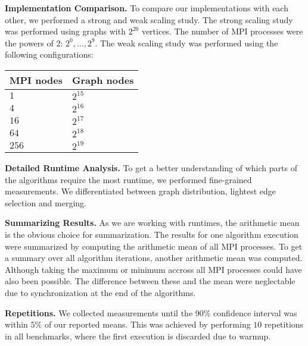\documentclass[letterpaper]{article}
\newcommand{\mypar}[1]{{\bf #1.}}
\begin{document}
\mypar{Implementation Comparison}
To compare our implementations with each other, we performed a strong and weak scaling study. The strong scaling study
was performed using graphs with $2^{20}$ vertices. The number of MPI processes were the powers of $2$: $2^0, \dotsc,
2^9$. The weak scaling study was performed using the following configurations:
\begin{table}[h!]
  \centering
  \begin{tabular}{ll} \toprule
    \textbf{MPI nodes} & \textbf{Graph nodes} \\\midrule
    $1$ & $2^{15}$ \\ 
    $4$ & $2^{16}$ \\ 
    $16$ & $2^{17}$ \\
    $64$ & $2^{18}$ \\
    $256$ & $2^{19}$ \\ \bottomrule \hline
  \end{tabular}
\end{table}

\mypar{Detailed Runtime Analysis}
To get a better understanding of which parts of the algorithms require the most runtime, we performed fine-grained
measurements. We differentiated between graph distribution, lightest edge selection and merging.

\mypar{Summarizing Results}
As we are working with runtimes, the arithmetic mean is the obvious choice for summarization. The results for one
algorithm execution were summarized by computing the arithmetic mean of all MPI processes. To get a summary over all
algorithm iterations, another arithmetic mean was computed. Although taking the maximum or minimum accross all MPI
processes could have also been possible. The difference between these and the mean were neglectable due to
synchronization at the end of the algorithms. %

\mypar{Repetitions}
We collected measurements until the $90\%$ confidence interval was within $5\%$ of our reported means. This was achieved
by performing $10$ repetitions in all benchmarks, where the first execution is discarded due to warmup.
\end{document}
